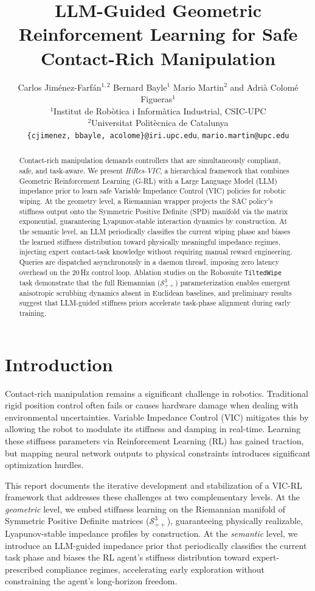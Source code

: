 \documentclass[letterpaper, 10 pt, conference]{IEEEtran}
\title{\LARGE \bf
LLM-Guided Geometric Reinforcement Learning for Safe Contact-Rich Manipulation
}
\author{Carlos Jiménez-Farfán$^{1,2}$ \quad Bernard Bayle$^{1}$ \quad Mario Martin$^{2}$ \quad and Adrià Colomé Figueras$^{1}$\\
$^{1}$Institut de Robòtica i Informàtica Industrial, CSIC-UPC \\
$^{2}$Universitat Politècnica de Catalunya \\
\texttt{\{cjimenez, bbayle, acolome\}@iri.upc.edu}, \quad \texttt{mario.martin@upc.edu}

}
\begin{document}
\maketitle
\thispagestyle{empty}
\pagestyle{empty}

\begin{abstract}
Contact-rich manipulation demands controllers that are simultaneously compliant, safe, and task-aware.
We present \textit{HiRes-VIC}, a hierarchical framework that combines Geometric Reinforcement Learning
(G-RL) with a Large Language Model (LLM) impedance prior to learn safe Variable Impedance Control
(VIC) policies for robotic wiping.
At the geometry level, a Riemannian wrapper projects the SAC policy's stiffness output onto the
Symmetric Positive Definite (SPD) manifold via the matrix exponential, guaranteeing Lyapunov-stable
interaction dynamics by construction.
At the semantic level, an LLM periodically classifies the current wiping phase and biases the
learned stiffness distribution toward physically meaningful impedance regimes, injecting expert
contact-task knowledge without requiring manual reward engineering.
Queries are dispatched asynchronously in a daemon thread, imposing zero latency overhead on the
20\,Hz control loop.
Ablation studies on the Robosuite \texttt{TiltedWipe} task demonstrate that the full Riemannian
($\mathcal{S}_{++}^3$) parameterization enables emergent anisotropic scrubbing dynamics absent in
Euclidean baselines, and preliminary results suggest that LLM-guided stiffness priors accelerate
task-phase alignment during early training.
\end{abstract}



\section{Introduction}
Contact-rich manipulation remains a significant challenge in robotics. Traditional rigid position control often fails or causes hardware damage when dealing with environmental uncertainties. Variable Impedance Control (VIC) mitigates this by allowing the robot to modulate its stiffness and damping in real-time. Learning these stiffness parameters via Reinforcement Learning (RL) has gained traction, but mapping neural network outputs to physical constraints introduces significant optimization hurdles.

This report documents the iterative development and stabilization of a VIC-RL framework that addresses these challenges at two complementary levels. At the \textit{geometric} level, we embed stiffness learning on the Riemannian manifold of Symmetric Positive Definite matrices ($\mathcal{S}_{++}^3$), guaranteeing physically realizable, Lyapunov-stable impedance profiles by construction. At the \textit{semantic} level, we introduce an LLM-guided impedance prior that periodically classifies the current task phase and biases the RL agent's stiffness distribution toward expert-prescribed compliance regimes, accelerating early exploration without constraining the agent's long-horizon freedom.
\end{document}
